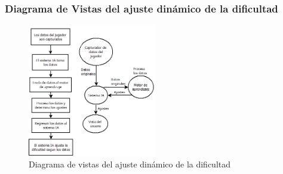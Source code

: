 \subsubsection{Diagrama de Vistas del ajuste dinámico de la dificultad}

\begin{figure}[H]
    \centering
    \includegraphics[width=0.5\textwidth]{recursos/Imagenes/Diagrama2Dificultad.png} 
    \caption{Diagrama de vistas del ajuste dinámico de la dificultad}
    \label{fig:mi_imagen}
\end{figure}